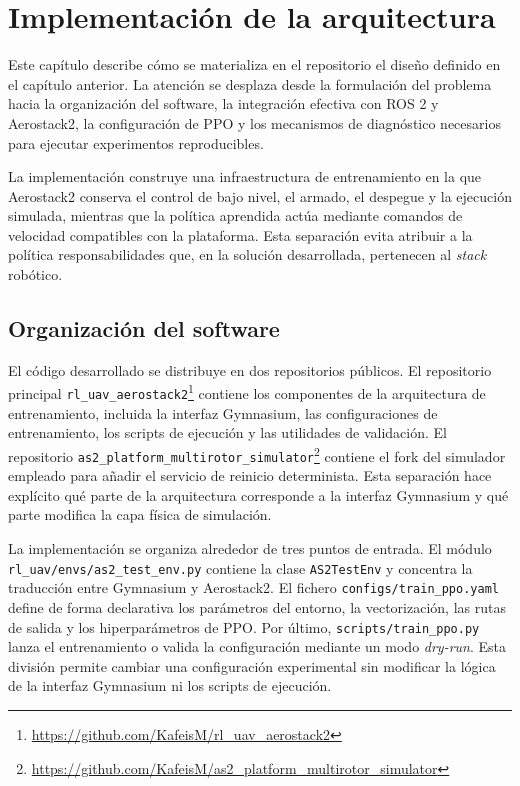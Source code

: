 \chapter{Implementación de la arquitectura} \label{chp:implementacion}

Este capítulo describe cómo se materializa en el repositorio el diseño definido
en el capítulo anterior. La atención se desplaza desde la formulación del
problema hacia la organización del software, la integración efectiva con ROS 2 y
Aerostack2, la configuración de PPO y los mecanismos de diagnóstico necesarios
para ejecutar experimentos reproducibles.

La implementación construye una infraestructura de entrenamiento en la que
Aerostack2 conserva el control de bajo nivel, el armado, el despegue y la
ejecución simulada, mientras que la política aprendida actúa mediante comandos
de velocidad compatibles con la plataforma. Esta separación evita atribuir a la
política responsabilidades que, en la solución desarrollada, pertenecen al
\emph{stack} robótico.

\section{Organización del software} \label{sct:implementacion:organizacion}

El código desarrollado se distribuye en dos repositorios públicos. El repositorio
principal \texttt{rl\_uav\_aerostack2}\footnote{\url{https://github.com/KafeisM/rl_uav_aerostack2}}
contiene los componentes de la arquitectura de entrenamiento, incluida la
interfaz Gymnasium, las configuraciones de entrenamiento, los
scripts de ejecución y las utilidades de validación. El repositorio
\texttt{as2\_platform\_multirotor\_simulator}\footnote{\url{https://github.com/KafeisM/as2_platform_multirotor_simulator}}
contiene el fork del simulador empleado para añadir el servicio de reinicio
determinista. Esta separación hace explícito qué parte de la arquitectura
corresponde a la interfaz Gymnasium y qué parte modifica la capa física de
simulación.

La implementación se organiza alrededor de tres puntos de entrada. El módulo \\
\texttt{rl\_uav/envs/as2\_test\_env.py} contiene la clase \texttt{AS2TestEnv}
y concentra la traducción entre Gymnasium y Aerostack2. El fichero
\texttt{configs/train\_ppo.yaml} define de forma declarativa los parámetros del
entorno, la vectorización, las rutas de salida y los hiperparámetros de PPO. Por
último, \texttt{scripts/train\_ppo.py} lanza el entrenamiento o valida la
configuración mediante un modo \emph{dry-run}. Esta división permite cambiar una
configuración experimental sin modificar la lógica de la interfaz Gymnasium ni los scripts de
ejecución.

